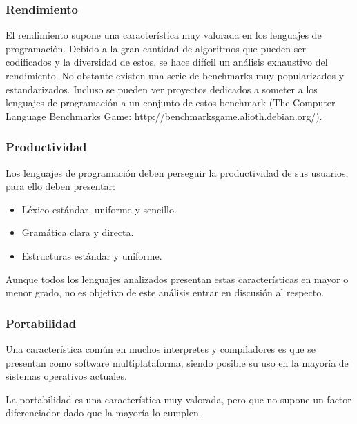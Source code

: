 \subsubsection{Rendimiento}
El rendimiento supone una característica muy valorada en los lenguajes de programación. 
Debido a la gran cantidad de algoritmos que pueden ser codificados y la diversidad de estos, se hace difícil un análisis exhaustivo del rendimiento.
No obstante existen una serie de benchmarks muy popularizados y estandarizados. Incluso se pueden ver proyectos dedicados a someter 
a los lenguajes de programación a un conjunto de estos benchmark (The Computer Language Benchmarks Game: http://benchmarksgame.alioth.debian.org/).

\subsubsection{Productividad}
Los lenguajes de programación deben perseguir la productividad de sus usuarios, para ello deben presentar: 
\begin{itemize}
\item Léxico estándar, uniforme y sencillo.
\item Gramática clara y directa.
\item Estructuras estándar y uniforme.
\end{itemize}

Aunque todos los lenguajes analizados presentan estas características en mayor o menor grado, no es objetivo 
de este análisis entrar en discusión al respecto.

\subsubsection{Portabilidad}
Una característica común en muchos interpretes y compiladores es que se presentan como software multiplataforma,
siendo posible su uso en la mayoría de sistemas operativos actuales. 

La portabilidad es una característica muy valorada, pero que no supone un factor diferenciador dado que la mayoría 
lo cumplen. 

